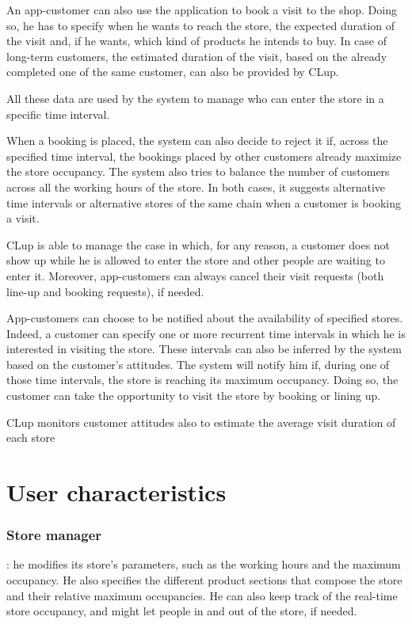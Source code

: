 \documentclass[a4paper,oneside,11pt]{book}   %
\begin{document}
    An app-customer can also use the application to book a visit to the shop. Doing so, he has to specify when he wants to reach the store, the expected duration of the visit and, if he wants, which kind of products he intends to buy. In case of long-term customers, the estimated duration of the visit, based on the already completed one of the same customer, can also be provided by CLup. \par
    All these data are used by the system to manage who can enter the store in a specific time interval. \par
    When a booking is placed, the system can also decide to reject it if, across the specified time interval, the bookings placed by other customers already maximize the store occupancy. The system also tries to balance the number of customers across all the working hours of the store. In both cases, it suggests alternative time intervals or alternative stores of the same chain when a customer is booking a visit. \par
    CLup is able to manage the case in which, for any reason, a customer does not show up while he is allowed to enter the store and other people are waiting to enter it. Moreover, app-customers can always cancel their visit requests (both line-up and booking requests), if needed. \par
    App-customers can choose to be notified about the availability of specified stores. Indeed, a customer can specify one or more recurrent time intervals in which he is interested in visiting the store. These intervals can also be inferred by the system based on the customer’s attitudes. The system will notify him if, during one of those time intervals, the store is reaching its maximum occupancy. Doing so, the customer can take the opportunity to visit the store by booking or lining up. \par
    CLup monitors customer attitudes also to estimate the average visit duration of each store

    \section{User characteristics}
    \subsubsection{Store manager}: he modifies its store’s parameters, such as the working hours and the maximum occupancy. He also specifies the different product sections that compose the store and their relative maximum occupancies. He can also keep track of the real-time store occupancy, and might let people in and out of the store, if needed.
\end{document}
